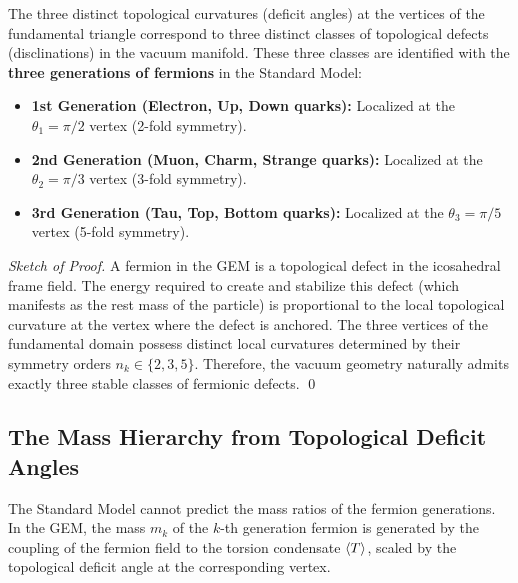 \begin{theorem}
\label{thm:3generations}
The three distinct topological curvatures (deficit angles) at the vertices of the fundamental triangle correspond to three distinct classes of topological defects (disclinations) in the vacuum manifold. These three classes are identified with the \textbf{three generations of fermions} in the Standard Model:
\begin{itemize}
    \item \textbf{1st Generation (Electron, Up, Down quarks):} Localized at the $\theta_1 = \pi/2$ vertex (2-fold symmetry).
    \item \textbf{2nd Generation (Muon, Charm, Strange quarks):} Localized at the $\theta_2 = \pi/3$ vertex (3-fold symmetry).
    \item \textbf{3rd Generation (Tau, Top, Bottom quarks):} Localized at the $\theta_3 = \pi/5$ vertex (5-fold symmetry).
\end{itemize}
\end{theorem}

\begin{proof}[Sketch of Proof]
A fermion in the GEM is a topological defect in the icosahedral frame field. The energy required to create and stabilize this defect (which manifests as the rest mass of the particle) is proportional to the local topological curvature at the vertex where the defect is anchored. The three vertices of the fundamental domain possess distinct local curvatures determined by their symmetry orders $n_k \in \{2, 3, 5\}$. Therefore, the vacuum geometry naturally admits exactly three stable classes of fermionic defects. \qed
\end{proof}

\subsection{The Mass Hierarchy from Topological Deficit Angles}

The Standard Model cannot predict the mass ratios of the fermion generations. In the GEM, the mass $m_k$ of the $k$-th generation fermion is generated by the coupling of the fermion field to the torsion condensate $\langle T \rangle$, scaled by the topological deficit angle at the corresponding vertex.

